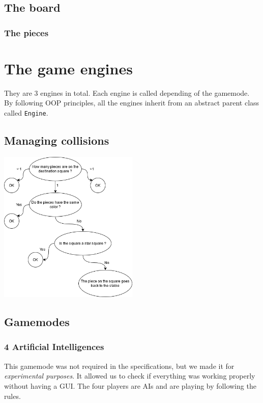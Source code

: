 \documentclass[english, 11pt, titlepage]{article}
\begin{document}
    \subsection{The board}
    \subsubsection{The pieces}

    \section{The game engines}
    They are 3 engines in total. Each engine is called depending of the gamemode. By following OOP principles, all the engines inherit from an abstract parent class called \verb|Engine|.
    \subsection{Managing collisions}
    \begin{center}
        \includegraphics[width=0.5\textwidth]{Logigram.png}
    \end{center}

    \subsection{Gamemodes}

    \subsubsection{4 Artificial Intelligences}
    This gamemode was not required in the specifications, but we made it for \emph{experimental purposes}. It allowed us to check if everything was working properly without having a GUI. The four players are AIs and are playing by following the rules.
\end{document}
